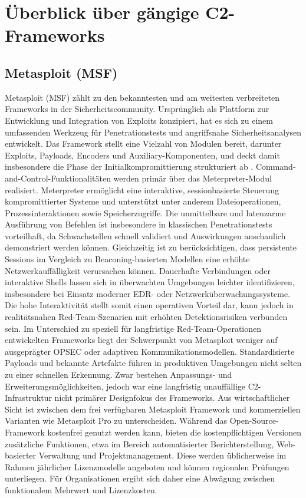 \section{Überblick über gängige C2-Frameworks}
\subsection{Metasploit (MSF)}
Metasploit (MSF) zählt zu den bekanntesten und am weitesten verbreiteten Frameworks in der Sicherheitscommunity. Ursprünglich als Plattform zur Entwicklung und Integration von Exploits konzipiert, hat es sich zu einem umfassenden Werkzeug für Penetrationstests und angriffsnahe Sicherheitsanalysen entwickelt. Das Framework stellt eine Vielzahl von Modulen bereit, darunter Exploits, Payloads, Encoders und Auxiliary-Komponenten, und deckt damit insbesondere die Phase der Initialkompromittierung strukturiert ab \cite{msf_module}. 
Command-and-Control-Funktionalitäten werden primär über das Meterpreter-Modul realisiert.
\newline\newline
Meterpreter ermöglicht eine interaktive, sessionbasierte Steuerung kompromittierter Systeme und unterstützt unter anderem Dateioperationen, Prozessinteraktionen sowie Speicherzugriffe. Die unmittelbare und latenzarme Ausführung von Befehlen ist insbesondere in klassischen Penetrationstests vorteilhaft, da Schwachstellen schnell validiert und Auswirkungen anschaulich demonstriert werden können. Gleichzeitig ist zu berücksichtigen, dass persistente Sessions im Vergleich zu Beaconing-basierten Modellen eine erhöhte Netzwerkauffälligkeit verursachen können. 
Dauerhafte Verbindungen oder interaktive Shells lassen sich in überwachten Umgebungen leichter identifizieren, insbesondere bei Einsatz moderner EDR- oder Netzwerküberwachungssysteme. 
Die hohe Interaktivität stellt somit einen operativen Vorteil dar, kann jedoch in realitätsnahen Red-Team-Szenarien mit erhöhten Detektionsrisiken verbunden sein.
\newline\newline
Im Unterschied zu speziell für langfristige Red-Team-Operationen entwickelten Frameworks liegt der Schwerpunkt von Metasploit weniger auf ausgeprägter OPSEC oder adaptiven Kommunikationsmodellen. Standardisierte Payloads und bekannte Artefakte führen in produktiven Umgebungen nicht selten zu einer schnellen Erkennung. Zwar bestehen Anpassungs- und Erweiterungsmöglichkeiten, jedoch war eine langfristig unauffällige C2-Infrastruktur nicht primärer Designfokus des Frameworks.
\newline\newline
Aus wirtschaftlicher Sicht ist zwischen dem frei verfügbaren Metasploit Framework und kommerziellen Varianten wie Metasploit Pro zu unterscheiden. Während das Open-Source-Framework kostenfrei genutzt werden kann, bieten die kostenpflichtigen Versionen zusätzliche Funktionen, etwa im Bereich automatisierter Berichterstellung, Web-basierter Verwaltung und Projektmanagement. Diese werden üblicherweise im Rahmen jährlicher Lizenzmodelle angeboten und können regionalen Prüfungen unterliegen. 
Für Organisationen ergibt sich daher eine Abwägung zwischen funktionalem Mehrwert und Lizenzkosten.

